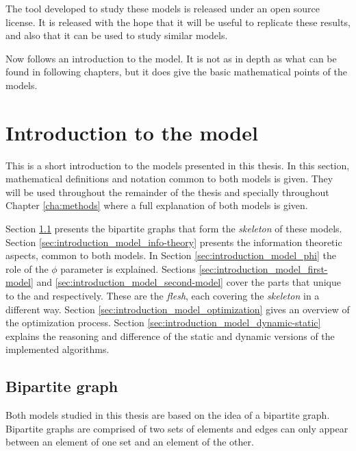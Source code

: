 
The tool developed to study these models is released under an open source license.
It is released with the hope that it will be useful to replicate these results, and also that it can be used to study similar models.


Now follows an introduction to the model.
It is not as in depth as what can be found in following chapters, but it does give the basic mathematical points of the models.

\section{Introduction to the model}
\label{sec:introduction_model}

This is a short introduction to the models presented in this thesis.
In this section, mathematical definitions and notation common to both models is given.
They will be used throughout the remainder of the thesis and specially throughout Chapter \ref{cha:methods} where a full explanation of both models is given.

Section \ref{sec:introduction_model_graph} presents the bipartite graphs that form the \emph{skeleton} of these models.
Section \ref{sec:introduction_model_info-theory} presents the information theoretic aspects, common to both models.
In Section \ref{sec:introduction_model_phi} the role of the $\phi$ parameter is explained.
Sections \ref{sec:introduction_model_first-model} and \ref{sec:introduction_model_second-model} cover the parts that unique to the \firstm{} and \secondmodel{} respectively. These are the \emph{flesh}, each covering the \emph{skeleton} in a different way.
Section \ref{sec:introduction_model_optimization} gives an overview of the optimization process.
Section \ref{sec:introduction_model_dynamic-static} explains the reasoning and difference of the static and dynamic versions of the implemented algorithms.

\subsection{Bipartite graph}
\label{sec:introduction_model_graph}

Both models studied in this thesis are based on the idea of a bipartite graph.
Bipartite graphs are comprised of two sets of elements and edges can only appear between an element of one set and an element of the other.

